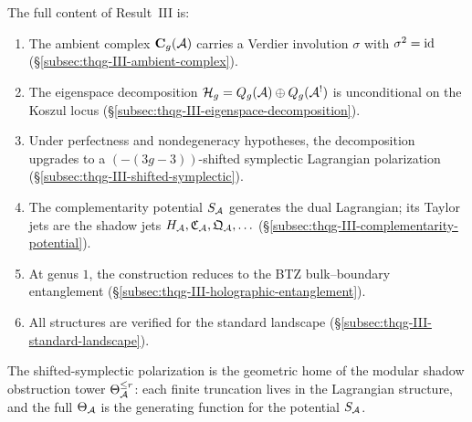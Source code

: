 \begin{remark}
\label{rem:thqg-III-summary}
The full content of Result~III is:
\begin{enumerate}[label=\textup{(\arabic*)}]
\item The ambient complex $\mathbf{C}_g(\mathcal{A})$ carries a
 Verdier involution $\sigma$ with $\sigma^2 = \mathrm{id}$
 (\S\ref{subsec:thqg-III-ambient-complex}).
\item The eigenspace decomposition
 $\mathcal{H}_g = Q_g(\mathcal{A}) \oplus Q_g(\mathcal{A}^!)$ is
 unconditional on the Koszul locus
 (\S\ref{subsec:thqg-III-eigenspace-decomposition}).
\item Under perfectness and nondegeneracy hypotheses,
 the decomposition upgrades to a $(-(3g-3))$-shifted
 symplectic Lagrangian polarization
 (\S\ref{subsec:thqg-III-shifted-symplectic}).
\item The complementarity potential $S_{\mathcal{A}}$ generates the
 dual Lagrangian; its Taylor jets are the shadow jets
 $H_{\mathcal{A}}, \mathfrak{C}_{\mathcal{A}}, \mathfrak{Q}_{\mathcal{A}}, \ldots$
 (\S\ref{subsec:thqg-III-complementarity-potential}).
\item At genus $1$, the construction reduces to the
 BTZ bulk--boundary entanglement
 (\S\ref{subsec:thqg-III-holographic-entanglement}).
\item All structures are verified for the standard landscape
 (\S\ref{subsec:thqg-III-standard-landscape}).
\end{enumerate}
The shifted-symplectic polarization is the geometric home of
the modular shadow obstruction tower $\Theta_{\mathcal{A}}^{\le r}$: each finite
truncation lives in the Lagrangian structure, and the full
$\Theta_{\mathcal{A}}$ is the generating function for the potential
$S_{\mathcal{A}}$.
\end{remark}
